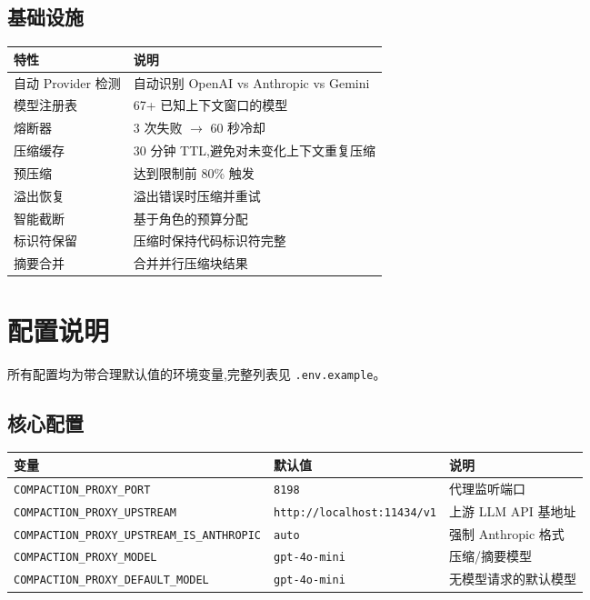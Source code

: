 \documentclass[11pt,a4paper]{article}
\begin{document}
\subsection{基础设施}

\begin{longtable}{@{}lp{8cm}@{}}
  \toprule
  特性 & 说明 \\
  \midrule
  自动 Provider 检测 & 自动识别 OpenAI vs Anthropic vs Gemini \\
  模型注册表 & 67+ 已知上下文窗口的模型 \\
  熔断器 & 3 次失败 $\rightarrow$ 60 秒冷却 \\
  压缩缓存 & 30 分钟 TTL,避免对未变化上下文重复压缩 \\
  预压缩 & 达到限制前 80\% 触发 \\
  溢出恢复 & 溢出错误时压缩并重试 \\
  智能截断 & 基于角色的预算分配 \\
  标识符保留 & 压缩时保持代码标识符完整 \\
  摘要合并 & 合并并行压缩块结果 \\
  \bottomrule
\end{longtable}

\section{配置说明}

所有配置均为带合理默认值的环境变量,完整列表见 \texttt{.env.example}。

\subsection{核心配置}

\begin{longtable}{@{}llp{7cm}@{}}
  \toprule
  变量 & 默认值 & 说明 \\
  \midrule
  \texttt{COMPACTION\_PROXY\_PORT} & \texttt{8198} & 代理监听端口 \\
  \texttt{COMPACTION\_PROXY\_UPSTREAM} & \texttt{http://localhost:11434/v1} & 上游 LLM API 基地址 \\
  \texttt{COMPACTION\_PROXY\_UPSTREAM\_IS\_ANTHROPIC} & \texttt{auto} & 强制 Anthropic 格式 \\
  \texttt{COMPACTION\_PROXY\_MODEL} & \texttt{gpt-4o-mini} & 压缩/摘要模型 \\
  \texttt{COMPACTION\_PROXY\_DEFAULT\_MODEL} & \texttt{gpt-4o-mini} & 无模型请求的默认模型 \\
  \bottomrule
\end{longtable}
\end{document}
